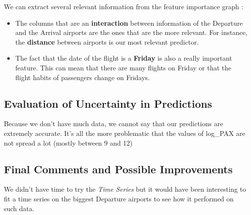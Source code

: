 \documentclass[a4paper,12pt,twoside]{article}
\begin{document}
We can extract several relevant information from the feature importance graph :

\begin{itemize}
	\item The columns that are an \textbf{interaction} between information of the Departure and the Arrival airports are the ones that are the more relevant. For instance, the \textbf{distance} between airports is our most relevant predictor.
	\item The fact that the date of the flight is a \textbf{Friday} is also a really important feature. This can mean that there are many flights on Friday or that the flight habits of passengers change on Fridays.
\end{itemize}

\subsection{Evaluation of Uncertainty in Predictions}

Because we don't have much data, we cannot say that our predictions are extremely accurate. It's all the more problematic that the values of log\_PAX are not spread a lot (mostly between 9 and 12)

\subsection{Final Comments and Possible Improvements}

We didn't have time to try the \textit{Time Series} but it would have been interesting to fit a time series on the biggest Departure airports to see how it performed on such data.
\end{document}
